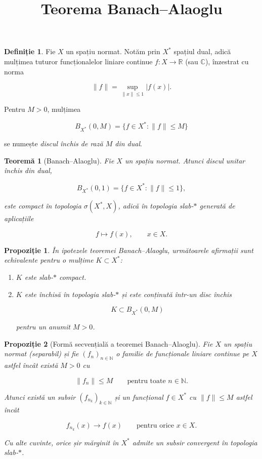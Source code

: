 \documentclass[12pt]{article}
\title{Teorema Banach--Alaoglu}
\author{}
\date{}
\theoremstyle{definition}
\newtheorem{definition}{Definiție}
\theoremstyle{plain}
\newtheorem{theorem}{Teoremă}
\newtheorem{proposition}{Propoziție}
\begin{document}
\maketitle

\begin{definition}
Fie $X$ un spațiu normat. Notăm prin $X^\ast$ spațiul dual, adică mulțimea tuturor funcționalelor liniare continue $f : X \to \mathbb{R}$ (sau $\mathbb{C}$), înzestrat cu norma


\[
\|f\| = \sup_{\|x\|\le 1} |f(x)|.
\]


Pentru $M > 0$, mulțimea


\[
B_{X^\ast}(0,M) = \{ f \in X^\ast : \|f\| \le M \}
\]


se numește \emph{discul închis de rază $M$ din dual}.
\end{definition}

\begin{theorem}[Banach--Alaoglu]
Fie $X$ un spațiu normat. Atunci discul unitar închis din dual,


\[
B_{X^\ast}(0,1) = \{ f \in X^\ast : \|f\| \le 1 \},
\]


este compact în topologia $\sigma(X^\ast, X)$, adică în topologia slab‑$\ast$ generată de aplicațiile


\[
f \mapsto f(x), \qquad x \in X.
\]


\end{theorem}

\begin{proposition}
În ipotezele teoremei Banach--Alaoglu, următoarele afirmații sunt echivalente pentru o mulțime $K \subset X^\ast$:
\begin{enumerate}
    \item[(i)] $K$ este slab‑$\ast$ compact.
    \item[(ii)] $K$ este închisă în topologia slab‑$\ast$ și este conținută într-un disc închis
    

\[
    K \subset B_{X^\ast}(0,M)
    \]


    pentru un anumit $M > 0$.
\end{enumerate}
\end{proposition}

\begin{proposition}[Formă secvențială a teoremei Banach--Alaoglu]
Fie $X$ un spațiu normat (separabil) și fie $(f_n)_{n\in\mathbb{N}}$ o familie de funcționale liniare continue pe $X$ astfel încât există $M>0$ cu


\[
\|f_n\|\le M \qquad \text{pentru toate } n\in\mathbb{N}.
\]


Atunci există un subsir $(f_{n_k})_{k\in\mathbb{N}}$ și un funcțional $f\in X^\ast$ cu $\|f\|\le M$ astfel încât


\[
f_{n_k}(x)\longrightarrow f(x) \qquad \text{pentru orice } x\in X.
\]


Cu alte cuvinte, orice șir mărginit în $X^\ast$ admite un subsir convergent în topologia slab‑$\ast$.
\end{proposition}
\end{document}
